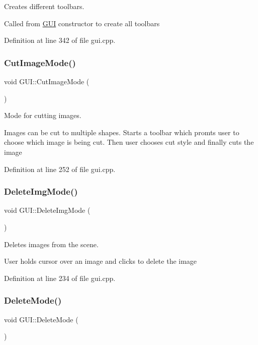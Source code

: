 Creates different toolbars. 

Called from \mbox{\hyperlink{classGUI}{G\+UI}} constructor to create all toolbars 

Definition at line 342 of file gui.\+cpp.

\mbox{\label{classGUI_ae8acfcce2ea4da241c920076b72f1c93}} 
\subsubsection{\texorpdfstring{Cut\+Image\+Mode()}{CutImageMode()}}
{\footnotesize\ttfamily void G\+U\+I\+::\+Cut\+Image\+Mode (\begin{DoxyParamCaption}{ }\end{DoxyParamCaption})}



Mode for cutting images. 

Images can be cut to multiple shapes. Starts a toolbar which promts user to choose which image is being cut. Then user chooses cut style and finally cuts the image 

Definition at line 252 of file gui.\+cpp.

\mbox{\label{classGUI_a453b758a292b4a0e6f52f25b1bb2de77}} 
\subsubsection{\texorpdfstring{Delete\+Img\+Mode()}{DeleteImgMode()}}
{\footnotesize\ttfamily void G\+U\+I\+::\+Delete\+Img\+Mode (\begin{DoxyParamCaption}{ }\end{DoxyParamCaption})}



Deletes images from the scene. 

User holds cursor over an image and clicks to delete the image 

Definition at line 234 of file gui.\+cpp.

\mbox{\label{classGUI_aac66154aaa763aac4d20e55cbd1bdc0d}} 
\subsubsection{\texorpdfstring{Delete\+Mode()}{DeleteMode()}}
{\footnotesize\ttfamily void G\+U\+I\+::\+Delete\+Mode (\begin{DoxyParamCaption}{ }\end{DoxyParamCaption})}



